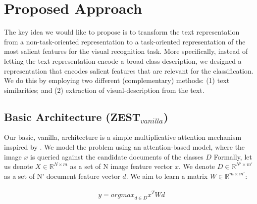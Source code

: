 \documentclass[11pt,a4paper]{article}
\newcommand\gal[1]{\textcolor{bright}{\textbf{GAL:} #1 }}
\begin{document}
\section{Proposed Approach}
\label{task}

The key idea we would like to propose is to transform the text representation from a non-task-oriented representation to a task-oriented representation of the most salient features for the visual recognition task. More specifically, instead of letting the text representation encode a broad class description, we designed a representation that encodes salient features that are relevant for the classification. We do this by employing two different (complementary) methods: (1) text similarities; and (2) extraction of visual-description from the text.


\subsection{Basic Architecture (ZEST$_{vanilla}$)}
\label{section_ZEST_C}


Our basic, vanilla, architecture is a simple multiplicative attention mechanism \cite{luong2015effective} inspired by \citet{romera2015embarrassingly}. We model the problem using an attention-based model, where the image $x$ is queried
against the candidate documents of the classes $D$ 
Formally, let us denote $X\in \mathbb{R}^{N\times m}$ as a set of N image feature vector $x$.
We denote $D\in \mathbb{R}^{N'\times m'}$ as a set of N' document feature vector $d$.
We aim to learn a matrix \(W\in  \mathbb{R}^{m\times m'}\):
 
\begin{equation}
\label{equation:attention}
\begin{aligned}
\begin{split}
&y={argmax}_{d\in D}x^TWd
\end{split}
\end{aligned}
\end{equation}



\end{document}
